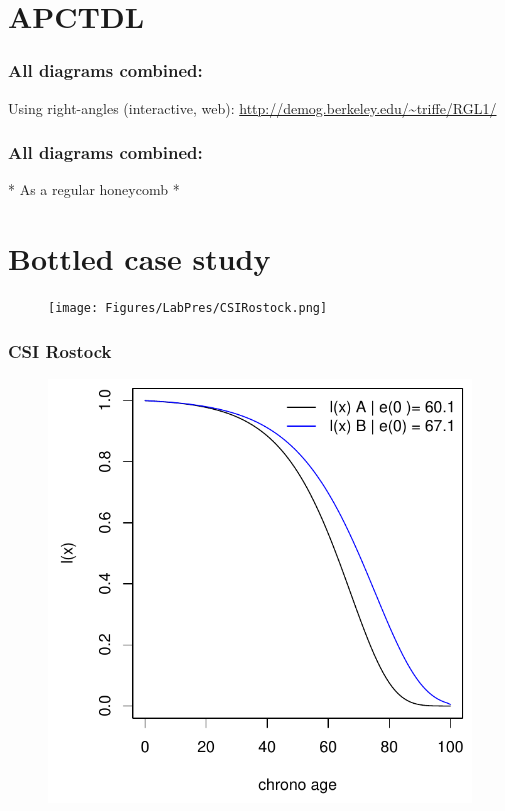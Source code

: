 \documentclass[20pt]{beamer}
\begin{document}
\section{APCTDL}

\begin{frame}
\frametitle{All diagrams combined:}
Using right-angles (interactive, web):
\url{http://demog.berkeley.edu/~triffe/RGL1/}

\end{frame}

\begin{frame}
\frametitle{All diagrams combined:}

* As a regular honeycomb *

\end{frame}

\section{Bottled case study}
\begin{frame}[plain]
\begin{figure}[b]
    \raggedright
    \texttt{[image: Figures/LabPres/CSIRostock.png]}
\end{figure}
\end{frame}

\begin{frame}
\frametitle{CSI Rostock}
\begin{figure}[b]
    \centering
    \includegraphics[scale=1.2]{Figures/LabPres/Z1PopAPopB.pdf}
\end{figure} 
\end{frame}
\end{document}
